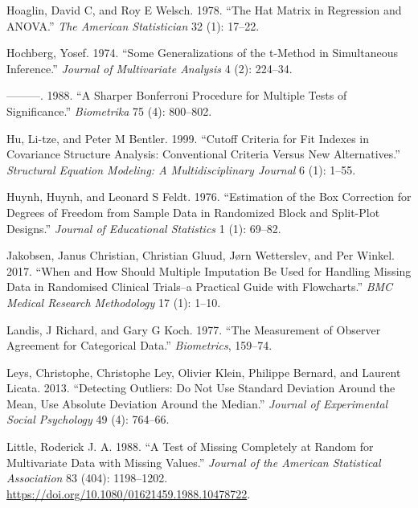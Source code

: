 \documentclass[
  letterpaper,
]{krantz}
\newlength{\cslhangindent}
\newenvironment{CSLReferences}[2] %
 {\begin{list}{}{%
  \setlength{\itemindent}{0pt}
  \setlength{\leftmargin}{0pt}
  \setlength{\parsep}{0pt}
  \ifodd #1
   \setlength{\leftmargin}{\cslhangindent}
   \setlength{\itemindent}{-1\cslhangindent}
  \fi
  \setlength{\itemsep}{#2\baselineskip}}}
 {\end{list}}
\begin{document}
\begin{CSLReferences}{1}{0}
Hoaglin, David C, and Roy E Welsch. 1978. {``The Hat Matrix in
Regression and ANOVA.''} \emph{The American Statistician} 32 (1):
17--22.

Hochberg, Yosef. 1974. {``Some Generalizations of the t-Method in
Simultaneous Inference.''} \emph{Journal of Multivariate Analysis} 4
(2): 224--34.

---------. 1988. {``A Sharper Bonferroni Procedure for Multiple Tests of
Significance.''} \emph{Biometrika} 75 (4): 800--802.

Hu, Li-tze, and Peter M Bentler. 1999. {``Cutoff Criteria for Fit
Indexes in Covariance Structure Analysis: Conventional Criteria Versus
New Alternatives.''} \emph{Structural Equation Modeling: A
Multidisciplinary Journal} 6 (1): 1--55.

Huynh, Huynh, and Leonard S Feldt. 1976. {``Estimation of the Box
Correction for Degrees of Freedom from Sample Data in Randomized Block
and Split-Plot Designs.''} \emph{Journal of Educational Statistics} 1
(1): 69--82.

Jakobsen, Janus Christian, Christian Gluud, Jørn Wetterslev, and Per
Winkel. 2017. {``When and How Should Multiple Imputation Be Used for
Handling Missing Data in Randomised Clinical Trials--a Practical Guide
with Flowcharts.''} \emph{BMC Medical Research Methodology} 17 (1):
1--10.

Landis, J Richard, and Gary G Koch. 1977. {``The Measurement of Observer
Agreement for Categorical Data.''} \emph{Biometrics}, 159--74.

Leys, Christophe, Christophe Ley, Olivier Klein, Philippe Bernard, and
Laurent Licata. 2013. {``Detecting Outliers: Do Not Use Standard
Deviation Around the Mean, Use Absolute Deviation Around the Median.''}
\emph{Journal of Experimental Social Psychology} 49 (4): 764--66.

Little, Roderick J. A. 1988. {``A Test of Missing Completely at Random
for Multivariate Data with Missing Values.''} \emph{Journal of the
American Statistical Association} 83 (404): 1198--1202.
\url{https://doi.org/10.1080/01621459.1988.10478722}.


\end{CSLReferences}
\end{document}
